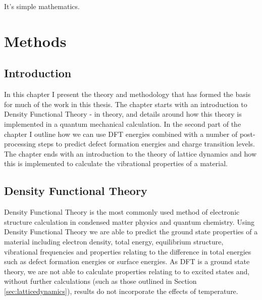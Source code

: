 \begin{savequote}[8cm]
It's simple mathematics.
\end{savequote}

\chapter{\label{ch:3-methods}Methods}

\minitoc



\section{Introduction} 

In this chapter I present the theory and methodology that has formed the basis for much of the work in this thesis. The chapter starts with an introduction to Density Functional Theory - in theory, and details around how this theory is implemented in a quantum mechanical calculation. In the second part of the chapter I outline how we can use DFT energies combined with a number of post-processing steps to predict defect formation energies and charge transition levels. The chapter ends with an introduction to the theory of lattice dynamics and how this is implemented to calculate the vibrational properties of a material. 

\section{Density Functional Theory}

Density Functional Theory is the most commonly used method of electronic structure calculation in condensed matter physics and quantum chemistry. 
Using Density Functional Theory we are able to predict the ground state properties of a material including electron density, total energy, equilibrium structure, vibrational frequencies and properties relating to the difference in total energies such as defect formation energies or surface energies. 
As DFT is a ground state theory, we are not able to calculate properties relating to to excited states and, without further calculations (such as those outlined in Section \ref{sec:latticedynamics}), results do not incorporate the effects of temperature. 



